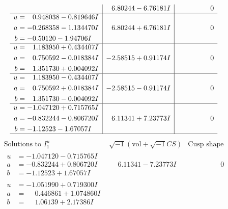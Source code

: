 \documentclass[1p]{elsarticle_modified}
\theoremstyle{definition}
\newcommand{\I}{\sqrt{-1}}
\begin{document}
$$\begin{array}{c|c|c}
 & \phantom{-}6.80244 - 6.76181 I & \phantom{-0.000000 } 0 \\ \hline\begin{aligned}
u &= \phantom{-}0.948038 - 0.819646 I \\
a &= -0.268358 - 1.134470 I \\
b &= -0.50120 - 1.94706 I\end{aligned}
 & \phantom{-}6.80244 + 6.76181 I & \phantom{-0.000000 } 0 \\ \hline\begin{aligned}
u &= \phantom{-}1.183950 + 0.434407 I \\
a &= \phantom{-}0.750592 - 0.018384 I \\
b &= \phantom{-}1.351730 + 0.004092 I\end{aligned}
 & -2.58515 + 0.91174 I & \phantom{-0.000000 } 0 \\ \hline\begin{aligned}
u &= \phantom{-}1.183950 - 0.434407 I \\
a &= \phantom{-}0.750592 + 0.018384 I \\
b &= \phantom{-}1.351730 - 0.004092 I\end{aligned}
 & -2.58515 - 0.91174 I & \phantom{-0.000000 } 0 \\ \hline\begin{aligned}
u &= -1.047120 + 0.715765 I \\
a &= -0.832244 - 0.806720 I \\
b &= -1.12523 - 1.67057 I\end{aligned}
 & \phantom{-}6.11341 + 7.23773 I & \phantom{-0.000000 } 0\\
 \hline 
 \end{array}$$\newpage$$\begin{array}{c|c|c}  
\text{Solutions to }I^u_{1}& \I (\text{vol} + \sqrt{-1}CS) & \text{Cusp shape}\\
 \hline 
\begin{aligned}
u &= -1.047120 - 0.715765 I \\
a &= -0.832244 + 0.806720 I \\
b &= -1.12523 + 1.67057 I\end{aligned}
 & \phantom{-}6.11341 - 7.23773 I & \phantom{-0.000000 } 0 \\ \hline\begin{aligned}
u &= -1.051990 + 0.719300 I \\
a &= \phantom{-}0.446861 + 1.074860 I \\
b &= \phantom{-}1.06139 + 2.17386 I\end{aligned}

\end{array}$$
\end{document}
